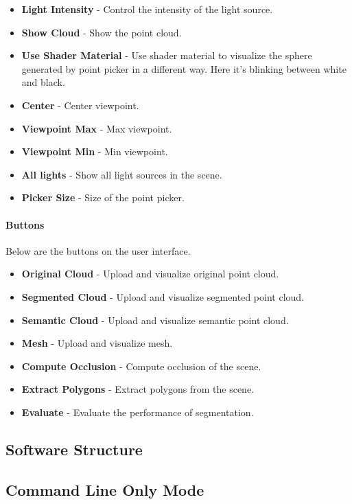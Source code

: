 \documentclass[11pt, a4paper,oneside,chapterprefix=false]{scrbook}
\begin{document}
\begin{itemize}
	\item \textbf{Light Intensity} - Control the intensity of the light source.
	\item \textbf{Show Cloud} - Show the point cloud.
	\item \textbf{Use Shader Material} - Use shader material to visualize the sphere generated by point picker in a different way. Here it's blinking between white and black.
	\item \textbf{Center} - Center viewpoint.
	\item \textbf{Viewpoint Max} - Max viewpoint.
	\item \textbf{Viewpoint Min} - Min viewpoint.
	\item \textbf{All lights} - Show all light sources in the scene.
	\item \textbf{Picker Size} - Size of the point picker.
\end{itemize}

\paragraph{Buttons}

Below are the buttons on the user interface.

\begin{itemize}
	\item \textbf{Original Cloud} - Upload and visualize original point cloud.
	\item \textbf{Segmented Cloud} - Upload and visualize segmented point cloud.
	\item \textbf{Semantic Cloud} - Upload and visualize semantic point cloud.
	\item \textbf{Mesh} - Upload and visualize mesh.
	\item \textbf{Compute Occlusion} - Compute occlusion of the scene.
	\item \textbf{Extract Polygons} - Extract polygons from the scene.
	\item \textbf{Evaluate} - Evaluate the performance of segmentation.
\end{itemize}

\subsection{Software Structure}


\subsection{Command Line Only Mode}
\end{document}
